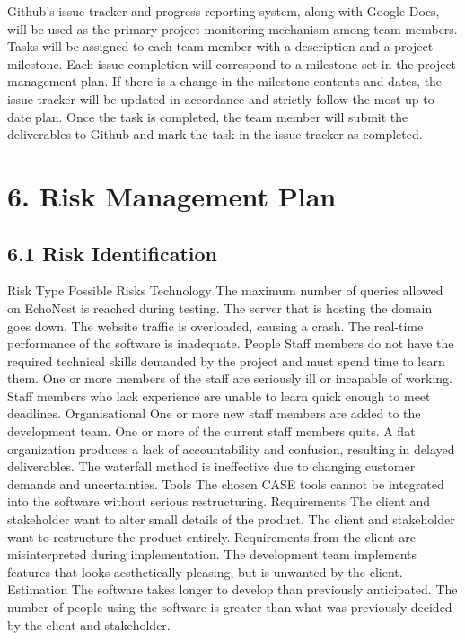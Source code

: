 \documentclass[]{article}
\begin{document}
Github's issue tracker and progress reporting system, along with Google
Docs, will be used as the primary project monitoring mechanism among
team members. Tasks will be assigned to each team member with a
description and a project milestone. Each issue completion will
correspond to a milestone set in the project management plan. If there
is a change in the milestone contents and dates, the issue tracker will
be updated in accordance and strictly follow the most up to date plan.
Once the task is completed, the team member will submit the deliverables
to Github and mark the task in the issue tracker as completed.

\section{6. Risk Management Plan}\label{risk-management-plan}

\subsection{6.1 Risk Identification}\label{risk-identification}

Risk Type Possible Risks Technology The maximum number of queries
allowed on EchoNest is reached during testing. The server that is
hosting the domain goes down. The website traffic is overloaded, causing
a crash. The real-time performance of the software is inadequate. People
Staff members do not have the required technical skills demanded by the
project and must spend time to learn them. One or more members of the
staff are seriously ill or incapable of working. Staff members who lack
experience are unable to learn quick enough to meet deadlines.
Organisational One or more new staff members are added to the
development team. One or more of the current staff members quits. A flat
organization produces a lack of accountability and confusion, resulting
in delayed deliverables. The waterfall method is ineffective due to
changing customer demands and uncertainties. Tools The chosen CASE tools
cannot be integrated into the software without serious restructuring.
Requirements The client and stakeholder want to alter small details of
the product. The client and stakeholder want to restructure the product
entirely. Requirements from the client are misinterpreted during
implementation. The development team implements features that looks
aesthetically pleasing, but is unwanted by the client. Estimation The
software takes longer to develop than previously anticipated. The number
of people using the software is greater than what was previously decided
by the client and stakeholder.
\end{document}

